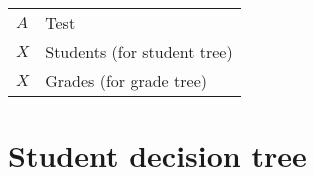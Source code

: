 \documentclass{article}
\begin{document}
\newenvironment{calcproof}{\[\begin{array}{c@{}l@{}}}
                     {\end{array}\]\ifhmode\unskip\par\fi\csname @endparenv\endcsname}
\newcommand\pterm[1]{\multicolumn{2}{l}{\displaystyle#1}\\}
\newcommand\pfeqonly[1]{%
   \mskip 15mu{}={} & \{\mbox{#1}\} \\
}
\newcommand\pfeq[2][]{\pfeqonly{#1}\pterm{#2}}
\newcommand\ptermmbox[1]{\multicolumn{2}{l}{\mbox{#1}}\\}
\newenvironment{codeproof}{\[\advance\extrarowheight by 2pt
                             \let\pterm=\ptermmbox\begin{array}{c@{}l@{}}}
                     {\end{array}\]\ifhmode\unskip\par\fi\csname @endparenv\endcsname}

\newcommand{\st}{\mid}
\newcommand{\soa}{\mbox{$s$ has $o$ at $A$}}

\begin{tabular}{ll}
  $A$ & Test \\
  $X$ & Students (for student tree) \\
  $X$ & Grades (for grade tree) \\
\end{tabular}

\section{Student decision tree}
\end{document}
